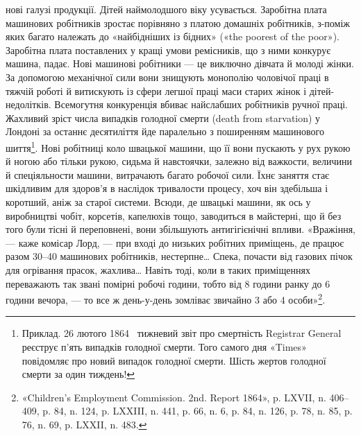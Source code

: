 \parcont{}  %
нові галузі продукції. Дітей наймолодшого віку усувається. Заробітна
плата машинових робітників зростає порівняно з платою
домашніх робітників, з-поміж яких багато належать до
«найбідніших із бідних» («the poorest of the poor»). Заробітна плата
поставлених у кращі умови ремісників, що з ними конкурує
машина, падає. Нові машинові робітники — це виключно дівчата
й молоді жінки. За допомогою механічної сили вони знищують
монополію чоловічої праці в тяжчій роботі й витискують із сфери
легшої праці маси старих жінок і дітей-недолітків. Всемогутня
конкуренція вбиває найслабших робітників ручної праці. Жахливий
зріст числа випадків голодної смерти (death from starvation)
у Лондоні за останнє десятиліття йде паралельно з поширенням
машинового шиття\footnote{
Приклад. 26 лютого 1864~ тижневий звіт про смертність Registrar
General реєструє п’ять випадків голодної смерти. Того самого
дня «Times» повідомляє про новий випадок голодної смерти. Шість жертов
голодної смерти за один тиждень!
}. Нові робітниці коло швацької машини,
що її вони пускають у рух рукою й ногою або тільки рукою,
сидьма й навстоячки, залежно від важкости, величини й спеціяльности
машини, витрачають багато робочої сили. Їхнє заняття стає
шкідливим для здоров’я в наслідок тривалости процесу, хоч він
здебільша і коротший, аніж за старої системи. Всюди, де швацькі
машини, як ось у виробництві чобіт, корсетів, капелюхів тощо,
заводиться в майстерні, що й без того були тісні й переповнені,
вони збільшують антигігієнічні впливи. «Вражіння, — каже комісар
Лорд, — при вході до низьких робітних приміщень, де працює
разом 30--40 машинових робітників, нестерпне\dots{} Спека, почасти
від газових пічок для огрівання прасок, жахлива\dots{} Навіть тоді,
коли в таких приміщеннях переважають так звані помірні робочі
години, тобто від 8 години ранку до 6 години вечора, — то все ж
день-у-день зомліває звичайно 3 або 4 особи»\footnote{
«Children’s Employment Commission. 2nd. Report 1864», p. LXVII,
n. 406--409, p. 84, n. 124, p. LXXIII, n. 441, p. 66, n. 6, p. 84, n. 126,
p. 78, n. 85, p. 76, n. 69, p. LXXII, n. 483.
}.

